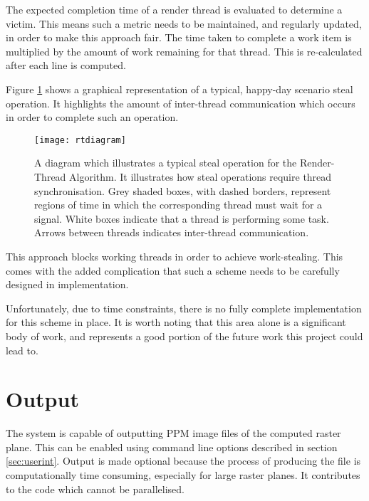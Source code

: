 The expected completion time of a render thread is evaluated to determine a victim. This means 
such a metric needs to be maintained, and regularly updated, in order to make this approach fair.
The time taken to complete a work item is multiplied by the amount of work remaining for that thread. 
This is re-calculated after each line is computed.

Figure \ref{fig:rtdiagram} shows a graphical representation of a typical, happy-day scenario steal operation. 
It highlights the amount of inter-thread communication which occurs in order to complete such an operation.  

\begin{figure}[H]
\centering
\texttt{[image: rtdiagram]}
\caption{
    A diagram which illustrates a typical steal operation for the Render-Thread Algorithm. 
    It illustrates how steal operations require thread synchronisation.
    Grey shaded boxes, with dashed borders, represent 
    regions of time in which the corresponding thread must wait for a signal. White boxes indicate that a thread 
    is performing some task. Arrows between threads indicates inter-thread communication.
}
\label{fig:rtdiagram}
\end{figure}

This approach blocks working threads in order to achieve work-stealing. This comes with the added complication
that such a scheme needs to be carefully designed in implementation. 


Unfortunately, due to time constraints, there is no fully complete implementation for this scheme in place.
It is worth noting that this area alone is a significant body of work, and represents a good portion
of the future work this project could lead to. 

\section{Output}
\label{sec:output}

The system is capable of outputting PPM image files of the computed raster plane. 
This can be enabled using command line options described in section \ref{sec:userint}.
Output is made optional because the process of producing the file is computationally time 
consuming, especially for large raster planes. It contributes to the code which 
cannot be parallelised.

